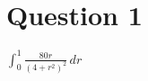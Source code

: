 \documentclass{article}
\begin{document}
\section{Question 1}
\(\int_{0}^{1} \frac{80r}{(4 + r^2)^2} \,dr\)
\end{document}
